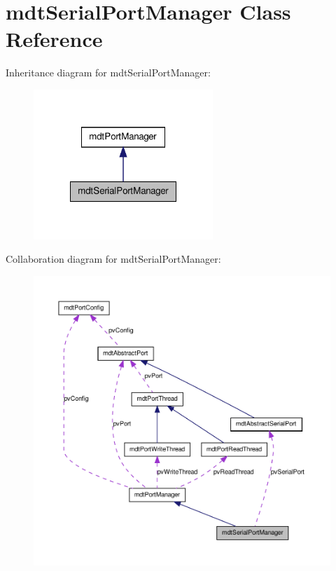 \hypertarget{classmdt_serial_port_manager}{
\section{mdtSerialPortManager Class Reference}
\label{classmdt_serial_port_manager}
}


Inheritance diagram for mdtSerialPortManager:\nopagebreak
\begin{figure}[H]
\begin{center}
\leavevmode
\includegraphics[width=192pt]{classmdt_serial_port_manager__inherit__graph}
\end{center}
\end{figure}


Collaboration diagram for mdtSerialPortManager:
\nopagebreak
\begin{figure}[H]
\begin{center}
\leavevmode
\includegraphics[width=400pt]{classmdt_serial_port_manager__coll__graph}
\end{center}
\end{figure}

